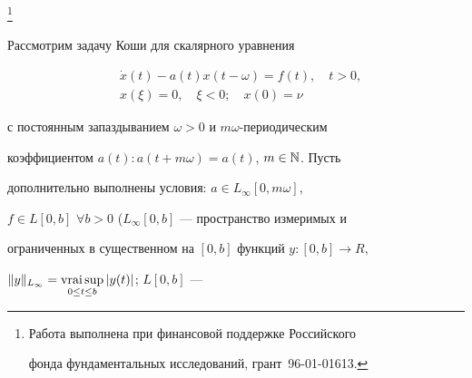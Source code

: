  


\thanks{Работа выполнена при финансовой поддержке Российского


фонда фундаментальных исследований, грант \No\,96-01-01613.}


\date{} 




 


\pagestyle{plain} %


 


 




 


\maketitle 


 




 


Рассмотрим задачу Коши для скалярного уравнения


\begin{equation}


\begin{split}


&\Dot x(t)-a(t)x(t-\omega)=f(t),\quad t>0,\\


&x(\xi)=0,\quad\xi<0;\quad x(0)=\nu


\end{split}


\end{equation}


с постоянным запаздыванием $\omega>0$ и $m\omega$-периодическим


коэффициентом $a(t):a(t+m\omega)=a(t)$, $m\in \Bbb N$. Пусть


дополнительно выполнены условия: $a\in L_\infty[0,m\omega]$,


$f\in L[0,b]$ $\forall b>0$ ($L_\infty[0,b]$ --- пространство измеримых и


ограниченных в существенном на $[0,b]$ функций $y:[0,b]\to R$,


$\|y\|_{L_\infty}=\vs\limits_{0\le t\le b}|y(t)|$; $L[0,b]$ ---


